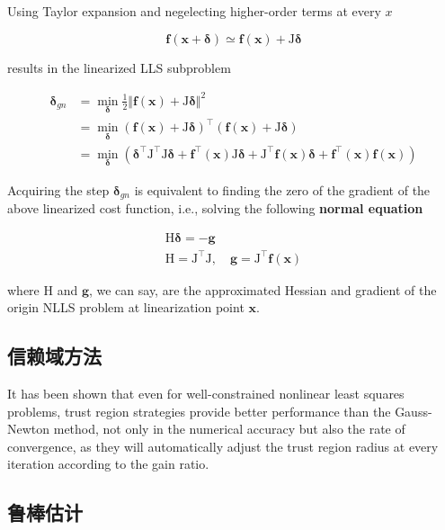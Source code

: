 Using Taylor expansion and negelecting higher-order terms at every $x$

\begin{equation}
    \mathbf{f}(\bm{x}+\bm{\delta}) \simeq \mathbf{f}(\bm{x}) + \mathrm{J}\bm{\delta}
\end{equation}

results in the linearized LLS subproblem

\begin{equation}
\begin{aligned}
    \bm{\delta}_{gn} &=
        \mathop{\min}_{\bm{\delta}}
        \frac{1}{2} \Vert \mathbf{f}(\bm{x}) + \mathrm{J}\bm{\delta} \Vert^2 \\ &=
        \mathop{\min}_{\bm{\delta}}
        \left( \mathbf{f}(\bm{x}) + \mathrm{J}\bm{\delta} \right)^\top
        \left( \mathbf{f}(\bm{x}) + \mathrm{J}\bm{\delta} \right) \\ &=
        \mathop{\min}_{\bm{\delta}}
        \left(
            \bm{\delta}^\top \mathrm{J}^\top \mathrm{J} \bm{\delta} +
            \mathbf{f}^\top(\bm{x}) \mathrm{J} \bm{\delta} +
            \mathrm{J}^\top \mathbf{f}(\bm{x}) \bm{\delta} +
            \mathbf{f}^\top(\bm{x}) \mathbf{f}(\bm{x})
        \right)
\end{aligned}
\end{equation}

Acquiring the step $\bm{\delta}_{gn}$ is equivalent to finding the zero of the gradient of the above linearized cost function, i.e., solving the following \textbf{normal equation}

\begin{equation}
\begin{gathered}
    \mathrm{H} \bm{\delta} = -\bm{g} \\
    \mathrm{H} = \mathrm{J}^\top \mathrm{J}, \quad
    \bm{g} = \mathrm{J}^\top \mathbf{f}(\bm{x})
\end{gathered}
\end{equation}

where $\mathrm{H}$ and $\bm{g}$, we can say, are the approximated Hessian and gradient of the origin NLLS problem at linearization point $\bm{x}$.

\subsection{信赖域方法}

It has been shown that even for well-constrained nonlinear least squares problems, trust region strategies provide better performance than the Gauss-Newton method, not only in the numerical accuracy but also the rate of convergence, as they will automatically adjust the trust region radius at every iteration according to the gain ratio.

\subsection{鲁棒估计}
